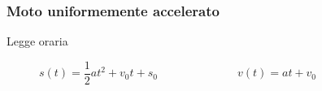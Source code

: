 \documentclass[a4paper,11pt,italian]{article}
\begin{document}
\subsubsection{Moto uniformemente accelerato}
\begin{description}
  \item[Legge oraria] 
  $ s(t) = \dfrac{1}{2} a t^2 + v_0 t + s_0 $~~~~~~~~~~~~~~$ v(t) = at + v_0 $
  
%

\end{description}
%
%   
\end{document}
